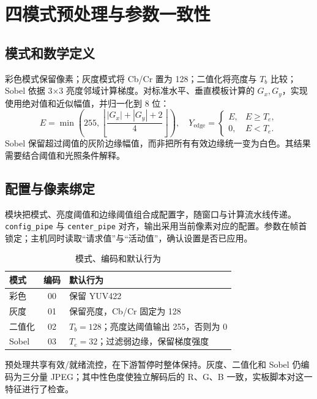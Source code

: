 \section{四模式预处理与参数一致性}
\subsection{模式和数学定义}
彩色模式保留像素；灰度模式将 Cb/Cr 置为 128；二值化将亮度与 $T_b$ 比较；Sobel 依据 3×3 亮度邻域计算梯度。对标准水平、垂直模板计算的 $G_x,G_y$，实现使用绝对值和近似幅值，并归一化到 8 位：
\begin{equation}
E=\min\left(255,\left\lfloor\frac{|G_x|+|G_y|+2}{4}\right\rfloor\right),\quad
Y_{\mathrm{edge}}=\begin{cases}E,&E\geq T_e,\\0,&E<T_e.\end{cases}
\end{equation}
Sobel 保留超过阈值的灰阶边缘幅值，而非把所有有效边缘统一变为白色。其结果需要结合阈值和光照条件解释。


\subsection{配置与像素绑定}
模块把模式、亮度阈值和边缘阈值组合成配置字，随窗口与计算流水线传递。
\texttt{config\_pipe} 与 \texttt{center\_pipe} 对齐，输出采用当前像素对应的配置。参数在帧首锁定；主机同时读取“请求值”与“活动值”，确认设置是否已应用。

\begin{table}[H]\centering\caption{模式、编码和默认行为}
\begin{tabularx}{\linewidth}{@{}lcY@{}}\toprule
模式 & 编码 & 默认行为\\\midrule
彩色 & 00 & 保留 YUV422\\
灰度 & 01 & 保留亮度，Cb/Cr 固定为 128\\
二值化 & 02 & $T_b=128$；亮度达阈值输出 255，否则为 0\\
Sobel & 03 & $T_e=32$；过滤弱边缘，保留梯度强度\\\bottomrule
\end{tabularx}\end{table}
预处理共享有效/就绪流控，在下游暂停时整体保持。灰度、二值化和 Sobel 仍编码为三分量 JPEG；其中性色度使独立解码后的 R、G、B 一致，实板脚本对这一特征进行了检查。
\clearpage
